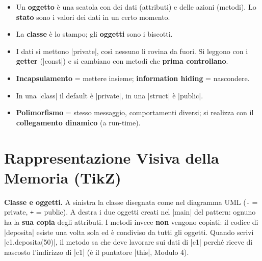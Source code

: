 \begin{inparole}
\begin{itemize}
  \item Un \textbf{oggetto} è una scatola con dei dati (attributi) e delle
        azioni (metodi). Lo \textbf{stato} sono i valori dei dati in un certo momento.
  \item La \textbf{classe} è lo stampo; gli \textbf{oggetti} sono i biscotti.
  \item I dati si mettono \cc|private|, così nessuno li rovina da fuori. Si
        leggono con i \textbf{getter} (\cc|const|) e si cambiano con metodi che
        \textbf{prima controllano}.
  \item \textbf{Incapsulamento} = mettere insieme; \textbf{information hiding} =
        nascondere.
  \item In una \cc|class| il default è \cc|private|, in una \cc|struct| è \cc|public|.
  \item \textbf{Polimorfismo} = stesso messaggio, comportamenti diversi; si
        realizza con il \textbf{collegamento dinamico} (a run-time).
\end{itemize}
\end{inparole}

\section{Rappresentazione Visiva della Memoria (TikZ)}

\textbf{Classe e oggetti.} A sinistra la classe disegnata come nel diagramma UML
(\texttt{-} = private, \texttt{+} = public). A destra i due oggetti creati nel
\cc|main| del pattern: ognuno ha la \textbf{sua copia} degli attributi.
I metodi invece \textbf{non} vengono copiati: il codice di \cc|deposita| esiste
una volta sola ed è condiviso da tutti gli oggetti. Quando scrivi
\cc|c1.deposita(50)|, il metodo sa che deve lavorare sui dati di \cc|c1|
perché riceve di nascosto l'indirizzo di \cc|c1| (è il puntatore \cc|this|,
Modulo 4).

